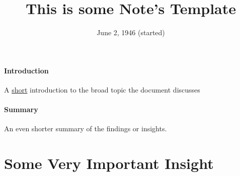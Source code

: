\documentclass{article}
\title{\huge {This is some Note's Template}}
\date{June 2, 1946 (started)}
\begin{document}
\maketitle
\doparttoc
\tableofcontents
%
\paragraph{Introduction} A \underline{short} introduction to the broad topic the document discusses
\paragraph{Summary} An even shorter summary of the findings or insights.
\section{Some Very Important Insight}






\end{document}
